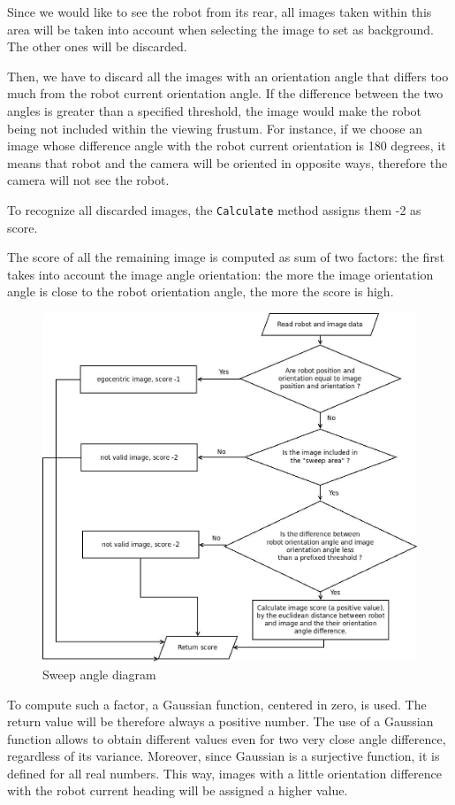%
Since we would like to see the robot from its rear, 
all images taken within this area will be taken into account
when selecting the image to set as background.
The other ones will be discarded.
%

%
Then, we have to discard all the images with an orientation 
angle that differs too much from the robot current orientation angle. 
If the difference between the two angles is greater than a specified 
threshold, the image would make the robot being not included 
within the viewing frustum.
%
For instance, if we choose an image whose difference angle with 
the robot current orientation is 180 degrees, it means that robot and 
the camera will be oriented in opposite ways, 
therefore the camera will not see the robot.
%

%
To recognize all discarded images, the \texttt{Calculate} method 
assigns them -2 as score.
%

%
The score of all the remaining image is computed as sum 
of two factors:
%
the first takes into account the image angle orientation: 
the more the image orientation angle is close to the 
robot orientation angle, the more the score is high.
%
\begin{figure}[!h]
  \begin{center}
    \includegraphics[width=400pt]{img/sweep_angle_diagram.jpeg} 
    \caption{Sweep angle diagram}
    \label{fig:sweep_angle_diagram}
  \end{center}
\end{figure}
%
To compute such a factor, a Gaussian function, centered
in zero, is used. The return value will be therefore 
always a positive number.
%
The use of a Gaussian function allows to obtain different 
values even for two very close angle difference, 
regardless of its variance. 
Moreover, since Gaussian is a surjective function, 
it is defined for all real numbers.
%
This way, images with a little orientation difference with 
the robot current heading will be assigned a higher value.
%

